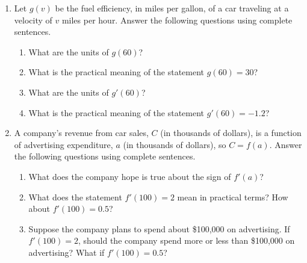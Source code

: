 \documentclass[10pt]{article}
\begin{document}
\drawtitle
\begin{enumerate}
\item Let $g(v)$ be the fuel efficiency, in miles per gallon, of a car
  traveling at a velocity of $v$ miles per hour. Answer the following
  questions using complete sentences.
  \begin{enumerate}
  \item What are the units of $g(60)$?

    \vfill
    
  \item What is the practical meaning of the statement $g(60) = 30$?

    \vfill
    
  \item What are the units of $g'(60)$?

    \vfill
    
  \item What is the practical meaning of the statement $g'(60) = -1.2$?

    \vfill
    
  \end{enumerate}

  \newpage

\item A company's revenue from car sales, $C$ (in thousands of
  dollars), is a function of advertising expenditure, $a$ (in
  thousands of dollars), so $C = f(a)$. Answer the following questions
  using complete sentences.
  \begin{enumerate}
  \item What does the company hope is true about the sign of $f'(a)$?

    \vfill
    
  \item What does the statement $f'(100) = 2$ mean in practical terms?
    How about $f'(100) = 0.5$?

    \vfill
    
  \item Suppose the company plans to spend about \$100,000 on
    advertising. If $f'(100)=2$, should the company spend more or less
    than \$100,000 on advertising? What if $f'(100) = 0.5$?

    \vfill
    
  \end{enumerate}
  


\end{enumerate}
\end{document}

